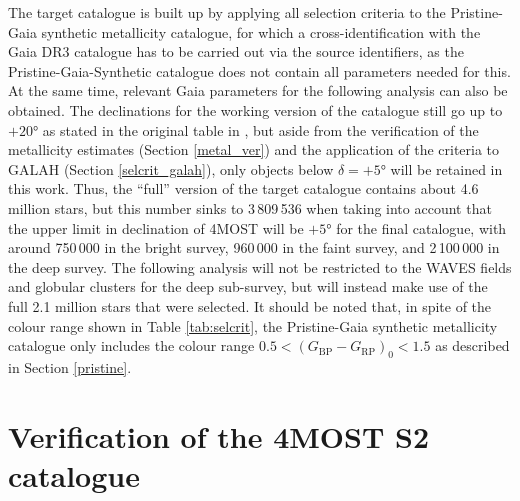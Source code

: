 \documentclass[a4paper,11pt]{article}
\begin{document}
%
The target catalogue is built up by applying all selection criteria to the Pristine-Gaia synthetic metallicity catalogue, for which a cross-identification with the Gaia DR3 catalogue has to be carried out via the source identifiers, as the Pristine-Gaia-Synthetic catalogue does not contain all parameters needed for this. At the same time, relevant Gaia parameters for the following analysis can also be obtained. The declinations for the working version of the catalogue still go up to $+20$° as stated in the original table in \citet{4mosts219}, but aside from the verification of the metallicity estimates (Section \ref{metal_ver}) and the application of the criteria to GALAH (Section \ref{selcrit_galah}), only objects below $\delta=+5$° will be retained in this work. Thus, the ``full'' version of the target catalogue contains about 4.6 million stars, but this number sinks to 3\,809\,536 when taking into account that the upper limit in declination of 4MOST will be $+5$° for the final catalogue, with around 750\,000 in the bright survey, 960\,000 in the faint survey, and 2\,100\,000 in the deep survey. The following analysis will not be restricted to the WAVES fields and globular clusters for the deep sub-survey, but will instead make use of the full 2.1 million stars that were selected. It should be noted that, in spite of the colour range shown in Table \ref{tab:selcrit}, the Pristine-Gaia synthetic metallicity catalogue only includes the colour range $0.5<(G_\mathrm{BP}-G_\mathrm{RP})_0<1.5$ as described in Section \ref{pristine}.
%
%
%
%
%
\clearpage
\section{Verification of the 4MOST S2 catalogue} \label{verification}
\end{document}
